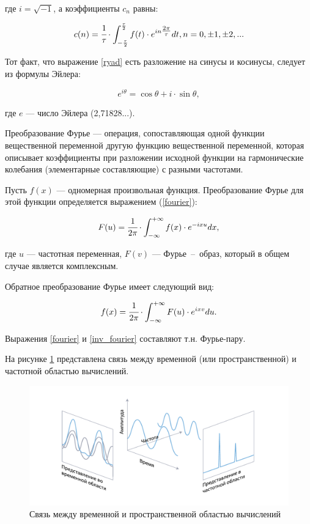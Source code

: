 где $i = \sqrt{-1}$, а коэффициенты $c_n$ равны:

\begin{equation}
	c(n) = \cfrac{1}{\tau}\cdot \int_{-\frac{\tau}{2}}^{\frac{\tau}{2}}f(t)\cdot e^{in{\textstyle \frac{2\pi}{\tau}}}dt, n = 0, \pm1, \pm2,...
\end{equation}

Тот факт, что выражение \ref{ryad} есть разложение на синусы и косинусы, следует из формулы Эйлера:

\begin{equation}
	e^{i\theta} = \cos\theta + i\cdot\sin\theta,
\end{equation}

где $e$ --- число Эйлера (2,71828...).

Преобразование Фурье --- операция, сопоставляющая одной функции вещественной переменной другую функцию вещественной переменной, которая описывает коэффициенты при разложении исходной функции на гармонические колебания (элементарные составляющие) с разными частотами.

Пусть $f(x)$ --- одномерная произвольная функция. Преобразование Фурье для этой функции определяется выражением (\ref{fourier}):

\begin{equation}\label{fourier}
	F(u) = \cfrac{1}{2\pi}\cdot \int_{-\infty}^{+\infty}f(x)\cdot e^{-ixu}dx,
\end{equation}

где $u$ --- частотная переменная, $F(v)$ --- Фурье~--~образ, который в общем случае является комплексным. 

Обратное преобразование Фурье имеет следующий вид:

\begin{equation}\label{inv_fourier}
	f(x) = \cfrac{1}{2\pi}\cdot \int_{-\infty}^{+\infty}F(u)\cdot e^{ixv}du.
\end{equation}

Выражения \ref{fourier} и \ref{inv_fourier} составляют т.н. Фурье-пару. 

На рисунке \ref{fig:example} представлена связь между временной (или пространственной) и частотной областью вычислений.

\begin{figure}[H]
	\centering
	\includegraphics[scale=0.85]{assets/frequency-domain.pdf}
	\caption{Связь между временной и пространственной областью вычислений}
	\label{fig:example}
\end{figure}

